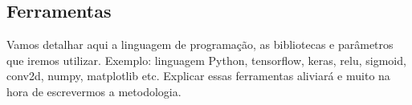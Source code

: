 \documentclass[twoside,conference,a4paper]{IEEEtran}
\begin{document}
\subsection{Ferramentas}

Vamos detalhar aqui a linguagem de programação, as bibliotecas e parâmetros que iremos utilizar.
Exemplo: linguagem Python, tensorflow, keras, relu, sigmoid, conv2d, numpy, matplotlib etc.
Explicar essas ferramentas aliviará e muito na hora de escrevermos a metodologia.






    


\end{document}
